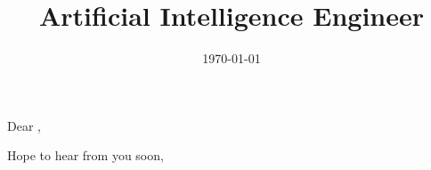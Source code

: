 \documentclass[11pt,a4paper,sans]{moderncv}
\title{Artificial Intelligence Engineer}
\begin{document}
\clearpage

\recipient{}{\\} 
\date{\today} 
\opening{Dear ,} 
\closing{Hope to hear from you soon,} 

\makelettertitle 



\makeletterclosing
\end{document}
